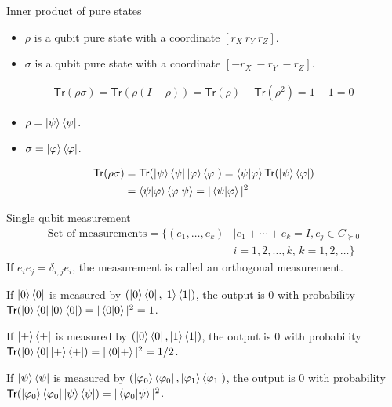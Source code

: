 \documentclass{beamer}
\newcommand{\Tr}{\mathsf{Tr}}
\newcommand\emm[1]{\textcolor{redorange}{{#1}}}
\begin{document}
\begin{frame}{Inner product of pure states}
\begin{itemize}
\item $\rho$ is a qubit pure state with a coordinate $[r_X\ r_Y\ r_Z]$.
\item $\sigma$ is a qubit pure state with a coordinate $[-r_X\ -r_Y\ -r_Z]$.
\end{itemize}
\begin{align*}
\Tr(\rho\sigma) =
\Tr(\rho(I-\rho)) =
\Tr(\rho)-\Tr(\rho^2) =1-1=0
\end{align*}

\vspace{2em}
\begin{itemize}
\item $\rho=\ket{\psi}\bra{\psi}$.
\item $\sigma=\ket{\varphi}\bra{\varphi}$.
\end{itemize}
\begin{align*}
\Tr(\rho\sigma) &=
\Tr(\ket{\psi}\bra{\psi}\ket{\varphi}\bra{\varphi}) =
\braket{\psi|\varphi}\Tr(\ket{\psi}\bra{\varphi})\\
 &= \braket{\psi|\varphi}\braket{\varphi|\psi}
 = |\braket{\psi|\varphi}|^2
\end{align*}
\end{frame}

\begin{frame}{Single qubit measurement}
\begin{align*}
\text{Set of measurements} = \{(e_1,\dotsc,e_k) &\mid e_1+\dotsb+e_k=I, e_j\in C_{\succeq 0}\\
&i=1,2,\dotsc,k,\, k=1,2,\dotsc\}
\end{align*}
If $e_i e_j = \delta_{i,j}e_i$, the measurement is called an \emm{orthogonal measurement}.

\vspace{1em}
If $\ket{0}\bra{0}$ is measured by $(\ket{0}\bra{0}, \ket{1}\bra{1})$,
the output is 0 with probability $\Tr(\ket{0}\bra{0} \ket{0}\bra{0})=|\braket{0|0}|^2=1$.

\vspace{1em}
If $\ket{+}\bra{+}$ is measured by $(\ket{0}\bra{0}, \ket{1}\bra{1})$,
the output is 0 with probability $\Tr(\ket{0}\bra{0} \ket{+}\bra{+})=|\braket{0|+}|^2=1/2$.

\vspace{1em}
If $\ket{\psi}\bra{\psi}$ is measured by $(\ket{\varphi_0}\bra{\varphi_0}, \ket{\varphi_1}\bra{\varphi_1})$,
the output is 0 with probability $\Tr(\ket{\varphi_0}\bra{\varphi_0} \ket{\psi}\bra{\psi})=|\braket{\varphi_0|\psi}|^2$.
\end{frame}
\end{document}
